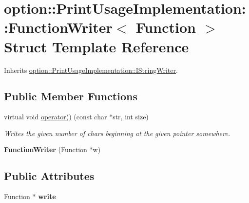 \hypertarget{structoption_1_1_print_usage_implementation_1_1_function_writer}{\section{option\-:\-:\-Print\-Usage\-Implementation\-:\-:\-Function\-Writer$<$ \-Function $>$ \-Struct \-Template \-Reference}
\label{structoption_1_1_print_usage_implementation_1_1_function_writer}
}


\-Inherits \hyperlink{structoption_1_1_print_usage_implementation_1_1_i_string_writer}{option\-::\-Print\-Usage\-Implementation\-::\-I\-String\-Writer}.

\subsection*{\-Public \-Member \-Functions}
\begin{DoxyCompactItemize}
\item 
\hypertarget{structoption_1_1_print_usage_implementation_1_1_function_writer_aa8e8f237845e210e36ca431d7e503a70}{virtual void \hyperlink{structoption_1_1_print_usage_implementation_1_1_function_writer_aa8e8f237845e210e36ca431d7e503a70}{operator()} (const char $\ast$str, int size)}\label{structoption_1_1_print_usage_implementation_1_1_function_writer_aa8e8f237845e210e36ca431d7e503a70}

\begin{DoxyCompactList}\small\item\em \-Writes the given number of chars beginning at the given pointer somewhere. \end{DoxyCompactList}\item 
\hypertarget{structoption_1_1_print_usage_implementation_1_1_function_writer_adc6c3f7ba11b3cad65c018955bab47e5}{{\bfseries \-Function\-Writer} (\-Function $\ast$w)}\label{structoption_1_1_print_usage_implementation_1_1_function_writer_adc6c3f7ba11b3cad65c018955bab47e5}

\end{DoxyCompactItemize}
\subsection*{\-Public \-Attributes}
\begin{DoxyCompactItemize}
\item 
\hypertarget{structoption_1_1_print_usage_implementation_1_1_function_writer_a3442e05eb04d2b1ee321193f5b10557b}{\-Function $\ast$ {\bfseries write}}\label{structoption_1_1_print_usage_implementation_1_1_function_writer_a3442e05eb04d2b1ee321193f5b10557b}

\end{DoxyCompactItemize}
